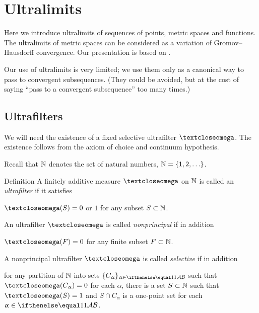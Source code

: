 \chapter{Ultralimits}

Here we introduce ultralimits of sequences of points, metric spaces and functions.
The ultralimits of metric spaces can be considered as a variation of Gromov--Hausdorff convergence.
Our presentation is based on \cite{kleiner-leeb}.

Our use of ultralimits is very limited; 
we use them only as a canonical way to pass to  convergent subsequences.
(They could be avoided, but at the cost of saying ``pass to a convergent subsequence'' too many times.)

\section{Ultrafilters}

We will need the existence of a fixed 
selective ultrafilter $\o$.
The existence follows from the axiom of choice and continuum hypothesis.

Recall that $\mathbb{N}$ denotes the set of natural numbers, $\NN=\{1,2,\dots\}$.

\begin{thm}{Definition}\label{def:ultrafilter}
A finitely additive measure $\o$ 
on  $\mathbb{N}$ 
is called an \emph{ultrafilter} if it satisfies 
\begin{subthm}{}
$\o(S)=0$ or $1$ for any subset $S\subset \NN$.
\end{subthm}
An ultrafilter $\o$ is called 
\emph{nonprincipal} if in addition 
\begin{subthm}{}
$\o(F)=0$ for any finite subset $F\subset \NN$.
\end{subthm}
A nonprincipal ultrafilter $\o$ is called 
\emph{selective} if in addition 
\begin{subthm}{}
for any partition of $\mathbb{N}$ into sets $\{C_\alpha\}_{\alpha\in\IndexSet}$ such that $\o(C_\alpha)\z=0$ for each $\alpha$, 
there is a set $S\subset \NN$ such that $\o(S)=1$ and $S\cap C_\alpha$ is a one-point set for each $\alpha\in\IndexSet$.
\end{subthm}
\end{thm}

